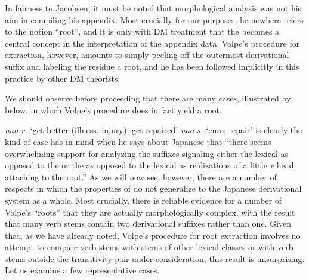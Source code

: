 \documentclass[output=paper,
modfonts
]{LSP/langsci}
\begin{document}
In fairness to Jacobsen, it must be noted that morphological analysis
was not his aim in compiling his appendix. Most crucially for our
purposes, he nowhere refers to the notion ``root'', and it is only with
 DM treatment that the  becomes a central concept in
the interpretation of the appendix data. Volpe's \citeyearpar[121 (note 27)]{volpe2005a} procedure for  extraction, however, amounts to simply peeling off
the outermost derivational suffix and labeling the residue a root, and
he has been followed implicitly in this practice by other DM theorists.

We should observe before proceeding that there are many cases,
illustrated by  below, in which Volpe's procedure does in fact yield
a root.

\ea \label{ex:dechene:5}
	\ea \label{ex:dechene:5a} \textit{nao-r-} `get better (illness, injury); get repaired'
	\ex \label{ex:dechene:5b} \textit{nao-s-} `cure; repair'
	\z
\z
{} is clearly the kind of case \citet[106]{marantz2013a} has in mind when he
says about Japanese that ``there seems overwhelming support for
analyzing the suffixes signaling either the lexical  as opposed
to the  or the  as opposed to the lexical 
as realizations of a little \textit{v} head attaching to the root.'' As we
will now see, however, there are a number of respects in which the
properties of  do not generalize to the Japanese derivational system
as a whole. Most crucially, there is reliable evidence for a number of
Volpe's ``roots'' that they are actually morphologically complex, with
the result that many verb stems contain two derivational suffixes rather
than one. Given that, as we have already noted, Volpe's procedure for
root extraction involves no attempt to compare verb stems with stems of
other lexical classes or with verb stems outside the transitivity pair
under consideration, this result is unsurprising. Let us examine a few
representative cases.
\end{document}
